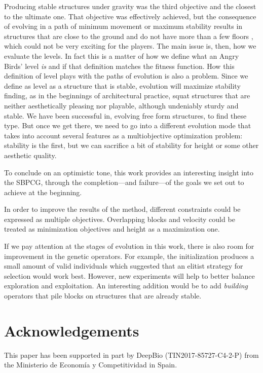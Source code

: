 \documentclass[a4paper,twoside]{article}
\begin{document}
Producing stable structures under gravity was the third objective and
the closest to the ultimate one. That objective was effectively
achieved, but the consequence of evolving in a path of minimum
movement or maximum stability results in structures that are close to
the ground and do not have more than a few floors , which could not be very 
exciting for the players. 
The main issue is, then, how we evaluate the levels. In fact this is 
a matter of how we define what an Angry Birds' level \textit{is} and if that 
definition matches the fitness function.
How this definition of level plays
with the paths of evolution is also a problem. Since we define as
level as a structure that is stable, evolution will maximize stability
finding, as in the beginnings of architectural practice, squat
structures that are neither aesthetically pleasing nor playable,
although undeniably sturdy and stable. We have been successful in,
evolving free form structures, to find these type. But once we get
there, we need to go into a different evolution mode that takes into
account several features as a multiobjective optimization problem:
stability is the first, but we can sacrifice a bit of stability for
height or some other aesthetic quality.


To conclude on an optimistic tone, this work provides an interesting insight 
into the SBPCG, through the completion---and failure---of the goals we
set out to achieve at the beginning.

In order to improve the results of the method, different constraints could be 
expressed as multiple objectives. Overlapping blocks and velocity could 
be treated as minimization objectives and height as a maximization one. 

If we pay attention at the stages of evolution in this work, there is also 
room for improvement in the genetic operators. For example, the initialization 
produces a small amount of valid individuals which suggested that an elitist 
strategy for selection would work best. However, new experiments will help to 
better balance exploration and exploitation. An interesting addition
would be to add {\em building} operators that pile blocks on
structures that are already stable. %

\section{Acknowledgements}
 This paper has been supported in part by DeepBio
 (TIN2017-85727-C4-2-P) from the Ministerio de Economía y Competitividad
 in Spain.


{\small
}
\end{document}

